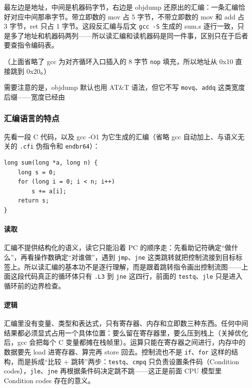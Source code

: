 最左边是地址，中间是机器码字节，右边是 objdump 还原出的汇编：一条汇编恰好对应中间那串字节。带立即数的 mov 占 5 字节，不带立即数的 mov 和 add 占 3 字节，ret 只占 1 字节。这段反汇编与后文 \texttt{gcc -S} 生成的 sum.s 逐行一致，只是多了地址和机器码两列——所以读汇编和读机器码是同一件事，区别只在于后者要查指令编码表。

（上面省略了 gcc 为对齐循环入口插入的 8 字节 \texttt{nop} 填充，所以地址从 0x10 直接跳到 0x20。）

需要注意的是，objdump 默认也用 AT\&T 语法，但它不写 \texttt{movq}、\texttt{addq} 这类宽度后缀——宽度已经由 %

\subsubsection{汇编语言的特点}

先看一段 C 代码，以及 gcc -O1 为它生成的汇编（省略 gcc 自动加上、与语义无关的 \texttt{.cfi} 伪指令和 \texttt{endbr64}）：

\begin{lstlisting}[style=MyCppStyle]
long sum(long *a, long n) {
    long s = 0;
    for (long i = 0; i < n; i++)
        s += a[i];
    return s;
}
\end{lstlisting}


\paragraph{读取}
汇编不提供结构化的语义，读它只能沿着 PC 的顺序走：先看助记符确定“做什么”，再看操作数确定“对谁做”，遇到 \texttt{jmp}、\texttt{jne} 这类跳转就把控制流接到目标标签上。所以读汇编的基本功不是逐行理解，而是跟着跳转指令画出控制流图——上面这段代码真正的循环体只有 \texttt{.L3} 到 \texttt{jne} 这四行，前面的 \texttt{testq}、\texttt{jle} 只是进入循环前的边界检查。

\paragraph{逻辑}
汇编里没有变量、类型和表达式，只有寄存器、内存和立即数三种东西。任何中间结果都必须显式占用一个具体位置：要么留在寄存器里，要么压到栈上（关掉优化后，gcc 会把每个 C 变量都摊在栈帧里）。运算只能在寄存器之间进行，内存中的数据要先 load 进寄存器、算完再 store 回去。控制流也不是 \texttt{if}、\texttt{for} 这样的结构，而是拆成“比较 + 跳转”两步：\texttt{testq}、\texttt{cmpq} 只负责设置条件码（Condition codes），\texttt{jle}、\texttt{jne} 再根据条件码决定跳不跳——这正是前面 CPU 模型里 Condition codes 存在的意义。

